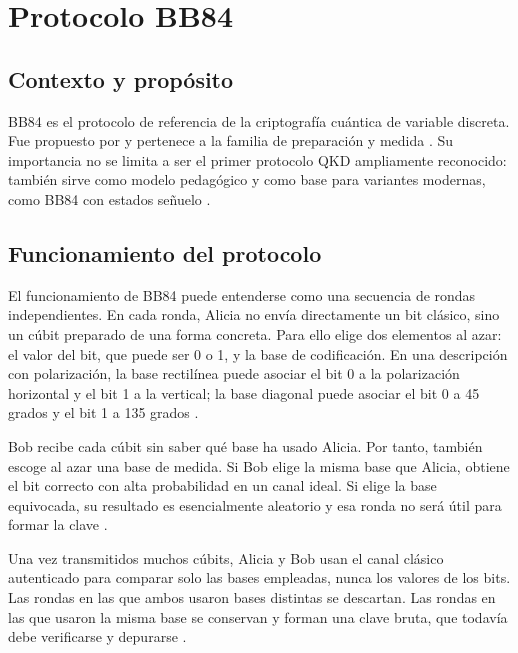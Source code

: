 \section{Protocolo BB84}

\subsection{Contexto y propósito}
BB84 es el protocolo de referencia de la criptografía cuántica de variable discreta. Fue propuesto por \cite{bennett1984} y pertenece a la familia de preparación y medida \citep{gisin2002,scarani2009}. Su importancia no se limita a ser el primer protocolo QKD ampliamente reconocido: también sirve como modelo pedagógico y como base para variantes modernas, como BB84 con estados señuelo \citep{hwang2003,lo2005,wang2005}.

\subsection{Funcionamiento del protocolo}
El funcionamiento de BB84 puede entenderse como una secuencia de rondas independientes. En cada ronda, Alicia no envía directamente un bit clásico, sino un cúbit preparado de una forma concreta. Para ello elige dos elementos al azar: el valor del bit, que puede ser 0 o 1, y la base de codificación. En una descripción con polarización, la base rectilínea puede asociar el bit 0 a la polarización horizontal y el bit 1 a la vertical; la base diagonal puede asociar el bit 0 a 45 grados y el bit 1 a 135 grados \citep{bennett1984,gisin2002}.

Bob recibe cada cúbit sin saber qué base ha usado Alicia. Por tanto, también escoge al azar una base de medida. Si Bob elige la misma base que Alicia, obtiene el bit correcto con alta probabilidad en un canal ideal. Si elige la base equivocada, su resultado es esencialmente aleatorio y esa ronda no será útil para formar la clave \citep{bennett1984,scarani2009}.

Una vez transmitidos muchos cúbits, Alicia y Bob usan el canal clásico autenticado para comparar solo las bases empleadas, nunca los valores de los bits. Las rondas en las que ambos usaron bases distintas se descartan. Las rondas en las que usaron la misma base se conservan y forman una clave bruta, que todavía debe verificarse y depurarse \citep{gisin2002,scarani2009}.


